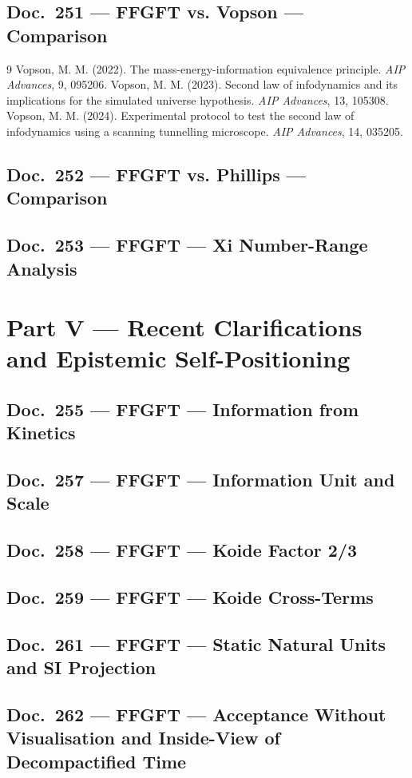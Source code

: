 	\chapter{Doc.~251 --- FFGFT vs. Vopson — Comparison}
	
	\begin{thebibliography}{9}
	Vopson, M. M. (2022). The mass-energy-information equivalence principle.
	\emph{AIP Advances}, 9, 095206.
	Vopson, M. M. (2023). Second law of infodynamics and its implications for the
	simulated universe hypothesis. \emph{AIP Advances}, 13, 105308.
	Vopson, M. M. (2024). Experimental protocol to test the second law of
	infodynamics using a scanning tunnelling microscope. \emph{AIP Advances}, 14, 035205.
	\end{thebibliography}
	\chapter{Doc.~252 --- FFGFT vs. Phillips — Comparison}
	
	\chapter{Doc.~253 --- FFGFT — Xi Number-Range Analysis}
	
	\part{Part V --- Recent Clarifications and Epistemic Self-Positioning}
	\chapter{Doc.~255 --- FFGFT — Information from Kinetics}
	
	\chapter{Doc.~257 --- FFGFT — Information Unit and Scale}
	
	\chapter{Doc.~258 --- FFGFT — Koide Factor 2/3}
	
	\chapter{Doc.~259 --- FFGFT — Koide Cross-Terms}
	
	\chapter{Doc.~261 --- FFGFT — Static Natural Units and SI Projection}
	
	\chapter{Doc.~262 --- FFGFT — Acceptance Without Visualisation and Inside-View of Decompactified Time}
	

